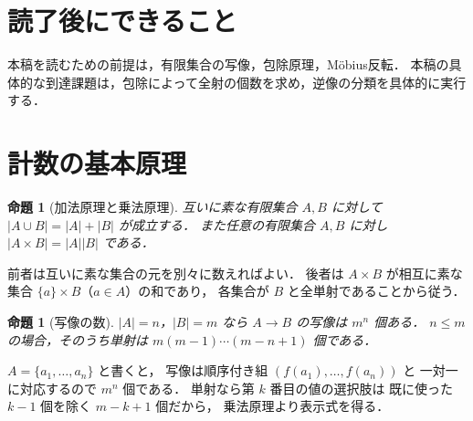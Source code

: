\documentclass[a5paper,10pt,onecolumn]{jsarticle}
\makeatletter
\theoremstyle{mathnotetheorem}
\newtheorem{proposition}[theorem]{命題}
\renewcommand{\proofname}{証明}
\renewenvironment{proof}[1][\proofname]{%
  \par\pushQED{\qed}\normalfont\topsep4\p@\@plus2\p@\relax
  \trivlist\item[\hskip\labelsep\bfseries #1]\ignorespaces
}{\popQED\endtrivlist\@endpefalse}
\makeatother
\begin{document}
\section*{読了後にできること}
本稿を読むための前提は，有限集合の写像，包除原理，Möbius反転．
本稿の具体的な到達課題は，包除によって全射の個数を求め，逆像の分類を具体的に実行する．

\section{計数の基本原理}
\begin{proposition}[加法原理と乗法原理]
互いに素な有限集合 $A,B$ に対して
$|A\cup B|=|A|+|B|$ が成立する．
また任意の有限集合 $A,B$ に対し
$|A\times B|=|A||B|$ である．
\end{proposition}
\begin{proof}
前者は互いに素な集合の元を別々に数えればよい．
後者は $A\times B$ が相互に素な集合
$\{a\}\times B$（$a\in A$）の和であり，
各集合が $B$ と全単射であることから従う．
\end{proof}
\begin{proposition}[写像の数]
$|A|=n$，$|B|=m$ なら $A\to B$ の写像は $m^n$ 個ある．
$n\le m$ の場合，そのうち単射は
$m(m-1)\cdots(m-n+1)$ 個である．
\end{proposition}
\begin{proof}
$A=\{a_1,\ldots,a_n\}$ と書くと，
写像は順序付き組 $(f(a_1),\ldots,f(a_n))$ と
一対一に対応するので $m^n$ 個である．
単射なら第 $k$ 番目の値の選択肢は
既に使った $k-1$ 個を除く $m-k+1$ 個だから，
乗法原理より表示式を得る．
\end{proof}
\end{document}
